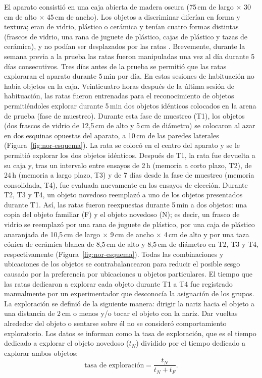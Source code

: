 El aparato consistió en una caja abierta de madera oscura (75\,cm de largo $\times$ 30\,cm de alto $\times$ 45\,cm de ancho). Los objetos a discriminar diferían en forma y textura; eran de vidrio, plástico o cerámica y tenían cuatro formas distintas (frascos de vidrio, una rana de juguete de plástico, cajas de plástico y tazas de cerámica), y no podían ser desplazados por las ratas \cite{perezgarcia2016malnutrition,leger2013nor}. Brevemente, durante la semana previa a la prueba las ratas fueron manipuladas una vez al día durante 5 días consecutivos. Tres días antes de la prueba se permitió que las ratas exploraran el aparato durante 5\,min por día. En estas sesiones de habituación no había objetos en la caja. Veinticuatro horas después de la última sesión de habituación, las ratas fueron entrenadas para el reconocimiento de objetos permitiéndoles explorar durante 5\,min dos objetos idénticos colocados en la arena de prueba (fase de muestreo). Durante esta fase de muestreo (T1), los objetos (dos frascos de vidrio de 12,5\,cm de alto y 5\,cm de diámetro) se colocaron al azar en dos esquinas opuestas del aparato, a 10\,cm de las paredes laterales (Figura~\ref{fig:nor-esquema}). La rata se colocó en el centro del aparato y se le permitió explorar los dos objetos idénticos. Después de T1, la rata fue devuelta a su caja y, tras un intervalo entre ensayos de 2\,h (memoria a corto plazo, T2), de 24\,h (memoria a largo plazo, T3) y de 7 días desde la fase de muestreo (memoria consolidada, T4), fue evaluada nuevamente en los ensayos de elección. Durante T2, T3 y T4, un objeto novedoso reemplazó a uno de los objetos presentados durante T1. Así, las ratas fueron reexpuestas durante 5\,min a dos objetos: una copia del objeto familiar (F) y el objeto novedoso (N); es decir, un frasco de vidrio se reemplazó por una rana de juguete de plástico, por una caja de plástico anaranjada de 10,5\,cm de largo $\times$ 9\,cm de ancho $\times$ 4\,cm de alto y por una taza cónica de cerámica blanca de 8,5\,cm de alto y 8,5\,cm de diámetro en T2, T3 y T4, respectivamente (Figura~\ref{fig:nor-esquema}). Todas las combinaciones y ubicaciones de los objetos se contrabalancearon para reducir el posible sesgo causado por la preferencia por ubicaciones u objetos particulares. El tiempo que las ratas dedicaron a explorar cada objeto durante T1 a T4 fue registrado manualmente por un experimentador que desconocía la asignación de los grupos. La exploración se definió de la siguiente manera: dirigir la nariz hacia el objeto a una distancia de 2\,cm o menos y/o tocar el objeto con la nariz. Dar vueltas alrededor del objeto o sentarse sobre él no se consideró comportamiento exploratorio. Los datos se informan como la tasa de exploración, que es el tiempo dedicado a explorar el objeto novedoso ($t_N$) dividido por el tiempo dedicado a explorar ambos objetos:
\begin{equation}
  \text{tasa de exploración} = \frac{t_N}{t_N + t_F}.
  \label{eq:tasa}
\end{equation}

